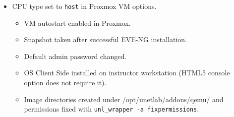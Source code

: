 \begin{itemize}
\tightlist
\item
  \textbullet{} CPU type set to \texttt{host} in Proxmox VM options.

  \begin{itemize}
  \tightlist
  \item
    \textbullet{} VM autostart enabled in Proxmox.
  \item
    \textbullet{} Snapshot taken after successful EVE-NG installation.
  \item
    \textbullet{} Default admin password changed.
  \item
    \textbullet{} OS Client Side installed on instructor workstation (HTML5 console option does not require it).
  \item
    \textbullet{} Image directories created under /opt/unetlab/addons/qemu/ and permissions fixed with \texttt{unl\_wrapper\ -a\ fixpermissions}.
  \end{itemize}
\end{itemize}
